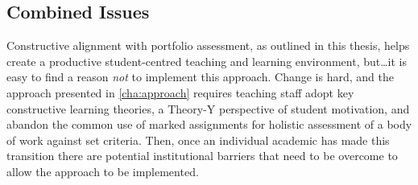 


\subsection{Combined Issues} %
\label{sub:combined_issues}

Constructive alignment with portfolio assessment, as outlined in this thesis, helps create a productive student-centred teaching and learning environment, but\ldots it is easy to find a reason \emph{not} to implement this approach. Change is hard, and the approach presented in \cref{cha:approach} requires teaching staff adopt key constructive learning theories, a Theory-Y perspective of student motivation, and abandon the common use of marked assignments for holistic assessment of a body of work against set criteria. Then, once an individual academic has made this transition there are potential institutional barriers that need to be overcome to allow the approach to be implemented. 


